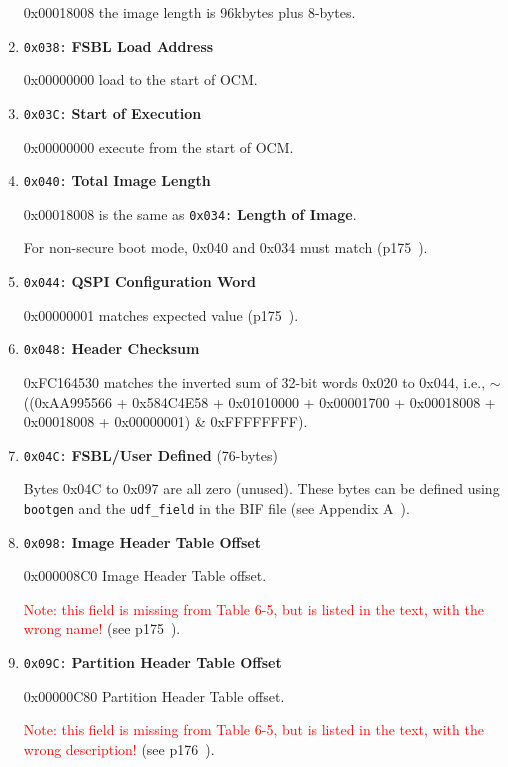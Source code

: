 \begin{enumerate}
0x00018008 the image length is 96kbytes plus 8-bytes.

\item \texttt{0x038:} \textbf{FSBL Load Address}

0x00000000 load to the start of OCM.

\item \texttt{0x03C:} \textbf{Start of Execution}

0x00000000 execute from the start of OCM.

\item \texttt{0x040:} \textbf{Total Image Length}

0x00018008 is the same as \texttt{0x034:} \textbf{Length of Image}.

For non-secure boot mode, 0x040 and 0x034 must match
(p175~\cite{Xilinx_UG585_2021}).

\item \texttt{0x044:} \textbf{QSPI Configuration Word}

0x00000001 matches expected value (p175~\cite{Xilinx_UG585_2021}).

\item \texttt{0x048:} \textbf{Header Checksum}

0xFC164530 matches the inverted sum of 32-bit words 0x020 to 0x044,
i.e., $\sim$((0xAA995566 + 0x584C4E58 + 0x01010000 + 0x00001700 + 0x00018008
+ 0x00018008 + 0x00000001) \& 0xFFFFFFFF).

\item \texttt{0x04C:} \textbf{FSBL/User Defined} (76-bytes)

Bytes 0x04C to 0x097 are all zero (unused). These bytes can be defined
using \verb+bootgen+ and the \verb+udf_field+ in the BIF file
(see Appendix A~\cite{Xilinx_UG821_2015}).

\item \texttt{0x098:} \textbf{Image Header Table Offset}

0x000008C0 Image Header Table offset.

\textcolor{red}{Note: this field is missing from Table 6-5, but is listed in
the text, with the wrong name!} (see p175~\cite{Xilinx_UG585_2021}).

\item \texttt{0x09C:} \textbf{Partition Header Table Offset}

0x00000C80 Partition Header Table offset.

\textcolor{red}{Note: this field is missing from Table 6-5, but is listed in
the text, with the wrong description!} (see p176~\cite{Xilinx_UG585_2021}).


\end{enumerate}
